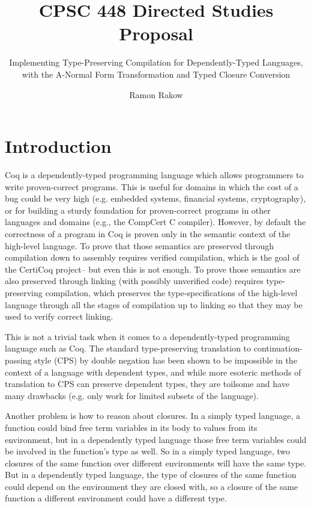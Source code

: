 \documentclass[sigconf,nonacm=true,10pt]{acmart}
\begin{document}
\title{CPSC 448 Directed Studies Proposal}
\subtitle{Implementing Type-Preserving Compilation for Dependently-Typed Languages, with the A-Normal Form Transformation and Typed Closure Conversion}

\author{Ramon Rakow}

\maketitle

\section{Introduction}

Coq is a dependently-typed programming language which allows programmers to write proven-correct programs. This is useful for domains in which the cost of a bug could be very high (e.g. embedded systems, financial systems, cryptography), or for building a sturdy foundation for proven-correct programs in other languages and domains (e.g., the CompCert C compiler). However, by default the correctness of a program in Coq is proven only in the semantic context of the high-level language. To prove that those semantics are preserved through compilation down to assembly requires verified compilation, which is the goal of the CertiCoq project-- but even this is not enough. To prove those semantics are also preserved through linking (with possibly unverified code) requires type-preserving compilation, which preserves the type-specifications of the high-level language through all the stages of compilation up to linking so that they may be used to verify correct linking. 

This is not a trivial task when it comes to a dependently-typed programming language such as Coq. The standard type-preserving translation to continuation-passing style (CPS) by double negation has been shown to be impossible in the context of a language with dependent types, and while more esoteric methods of translation to CPS can preserve dependent types, they are toilsome and have many drawbacks (e.g. only work for limited subsets of the language). 

Another problem is how to reason about closures. In a simply typed language, a function could bind free term variables in its body to values from its environment, but in a dependently typed language those free term variables could be involved in the function's type as well. So in a simply typed language, two closures of the same function over different environments will have the same type. But in a dependently typed language, the type of closures of the same function could depend on the environment they are closed with, so a closure of the same function a different environment could have a different type.
\end{document}

